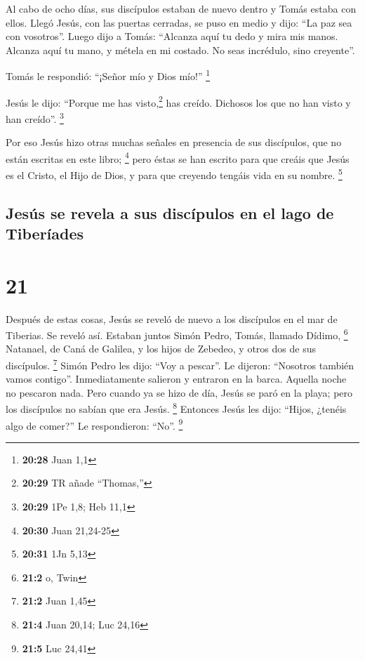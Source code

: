  Al cabo de ocho días, sus discípulos estaban de nuevo
dentro y Tomás estaba con ellos. Llegó Jesús, con las puertas cerradas,
se puso en medio y dijo: ``La paz sea con vosotros''. 
Luego dijo a Tomás: ``Alcanza aquí tu dedo y mira mis manos. Alcanza
aquí tu mano, y métela en mi costado. No seas incrédulo, sino
creyente''.

 Tomás le respondió: ``¡Señor mío y Dios mío!''
\footnote{\textbf{20:28} Juan 1,1}

 Jesús le dijo: ``Porque me has visto,\footnote{\textbf{20:29}
  TR añade ``Thomas,''} has creído. Dichosos los que no han visto y han
creído''. \footnote{\textbf{20:29} 1Pe 1,8; Heb 11,1}

 Por eso Jesús hizo otras muchas señales en presencia de
sus discípulos, que no están escritas en este libro; \footnote{\textbf{20:30}
  Juan 21,24-25}  pero éstas se han escrito para que
creáis que Jesús es el Cristo, el Hijo de Dios, y para que creyendo
tengáis vida en su nombre. \footnote{\textbf{20:31} 1Jn 5,13}

\hypertarget{jesuxfas-se-revela-a-sus-discuxedpulos-en-el-lago-de-tiberuxedades}{%
\subsection{Jesús se revela a sus discípulos en el lago de
Tiberíades}\label{jesuxfas-se-revela-a-sus-discuxedpulos-en-el-lago-de-tiberuxedades}}

\hypertarget{section-20}{%
\section{21}\label{section-20}}

 Después de estas cosas, Jesús se reveló de nuevo a los
discípulos en el mar de Tiberias. Se reveló así.  Estaban
juntos Simón Pedro, Tomás, llamado Dídimo, \footnote{\textbf{21:2} o,
  Twin} Natanael, de Caná de Galilea, y los hijos de Zebedeo, y otros
dos de sus discípulos. \footnote{\textbf{21:2} Juan 1,45} 
Simón Pedro les dijo: ``Voy a pescar''. Le dijeron: ``Nosotros también
vamos contigo''. Inmediatamente salieron y entraron en la barca. Aquella
noche no pescaron nada.  Pero cuando ya se hizo de día,
Jesús se paró en la playa; pero los discípulos no sabían que era Jesús.
\footnote{\textbf{21:4} Juan 20,14; Luc 24,16}  Entonces
Jesús les dijo: ``Hijos, ¿tenéis algo de comer?'' Le respondieron:
``No''. \footnote{\textbf{21:5} Luc 24,41}

